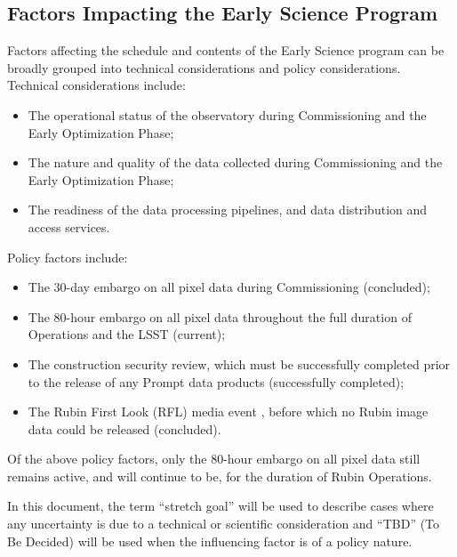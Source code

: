 \subsection{Factors Impacting the Early Science Program}
\label{ssec:impact}
Factors affecting the schedule and contents of the Early Science program can be broadly grouped into technical considerations and policy considerations.
Technical considerations include:
\begin{itemize}
\item The operational status of the observatory during Commissioning  and the Early Optimization Phase;
\item The nature and quality of the data collected during Commissioning and the Early Optimization Phase;
\item The readiness of the data processing pipelines, and data distribution and access services.
\end{itemize}
Policy factors include:
\begin{itemize}
\item The 30-day embargo on all pixel data during Commissioning (concluded);
\item The 80-hour embargo on all pixel data throughout the full duration of Operations and the LSST (current);
\item The  construction security review, which must be successfully completed prior to the release of any Prompt data products (successfully completed);
\item The Rubin First Look (RFL) media event \citep[][]{RTN-083},  before which no Rubin image data could be released (concluded).
\end{itemize}
Of the above policy factors, only the 80-hour embargo on all pixel data still remains active, and will continue to be, for the duration of Rubin Operations.

In this document, the term ``stretch goal'' will be used to describe cases where any uncertainty is due to a technical or scientific consideration and ``TBD'' (To Be Decided) will be used when the influencing factor is of a policy nature.
